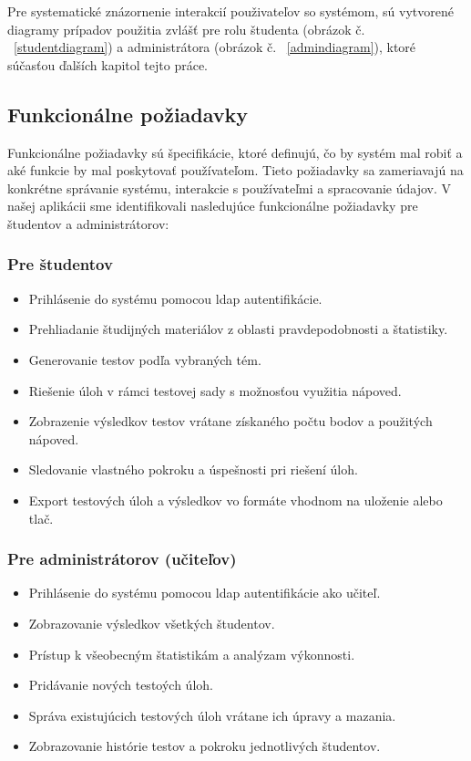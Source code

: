   Pre systematické znázornenie interakcií použivateľov so systémom, sú vytvorené diagramy prípadov použitia zvlášť pre rolu študenta (obrázok č. ~\ref{studentdiagram}) a administrátora (obrázok č. ~\ref{admindiagram}), ktoré súčasťou ďalších kapitol tejto práce.

\subsection{Funkcionálne požiadavky}
Funkcionálne požiadavky sú špecifikácie, ktoré definujú, čo by systém mal robiť a aké funkcie by mal poskytovať používateľom.
 Tieto požiadavky sa zameriavajú na konkrétne správanie systému, interakcie s používateľmi a spracovanie údajov. 
 V našej aplikácii sme identifikovali nasledujúce funkcionálne požiadavky pre študentov a administrátorov:
 \subsubsection*{Pre študentov}
 \begin{itemize}
   \item Prihlásenie do systému pomocou \acrshort{ldap} autentifikácie.
   \item Prehliadanie študijných materiálov z oblasti pravdepodobnosti a štatistiky.
   \item Generovanie testov podľa vybraných tém.
   \item Riešenie úloh v rámci testovej sady s možnosťou využitia nápoved.
   \item Zobrazenie výsledkov testov vrátane získaného počtu bodov a použitých nápoved.
   \item Sledovanie vlastného pokroku a úspešnosti pri riešení úloh.
   \item Export testových úloh a výsledkov vo formáte vhodnom na uloženie alebo tlač.
 \end{itemize}
 
\subsubsection*{Pre administrátorov (učiteľov)}
\begin{itemize}
  \item Prihlásenie do systému pomocou \acrshort{ldap} autentifikácie ako učiteľ.
\item Zobrazovanie výsledkov všetkých študentov.
\item Prístup k všeobecným štatistikám a analýzam výkonnosti.
\item Pridávanie nových testoých úloh.
\item Správa existujúcich testových úloh vrátane ich úpravy a mazania.
\item Zobrazovanie histórie testov a pokroku jednotlivých študentov.
  \end{itemize}


